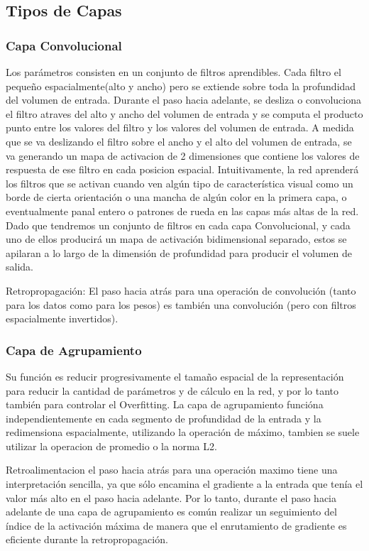 \documentclass[a4paper,11pt,spanish]{book}
\begin{document}
    \subsection {Tipos de Capas}
      \subsubsection{Capa Convolucional} 
	Los parámetros consisten en un conjunto de filtros aprendibles. Cada filtro el pequeño espacialmente(alto y ancho) pero se extiende sobre toda la profundidad del volumen de entrada.
	Durante el paso hacia adelante, se desliza o convoluciona el filtro atraves del alto y ancho del volumen de entrada y se computa el producto punto entre los valores del filtro y los valores
	del volumen de entrada. A medida que se va deslizando el filtro sobre el ancho y el alto del volumen de entrada, se va generando un mapa de activacion de 2 dimensiones que contiene los 
	valores de respuesta de ese filtro en cada posicion espacial.
	Intuitivamente, la red aprenderá los filtros que se activan cuando ven algún tipo de característica visual como un borde de cierta orientación o una mancha de algún color en la 
	primera capa, o eventualmente panal entero o patrones de rueda en las capas más altas de la red. Dado que tendremos un conjunto de filtros en cada capa Convolucional, 
	y cada uno de ellos producirá un mapa de activación bidimensional separado, estos se apilaran a lo largo de la dimensión de profundidad para producir el volumen de salida.

	Retropropagación: El paso hacia atrás para una operación de convolución (tanto para los datos como para los pesos) es también una convolución (pero con filtros espacialmente invertidos).

      \subsubsection{Capa de Agrupamiento} 
	Su función es reducir progresivamente el tamaño espacial de la representación para reducir la cantidad de parámetros y de cálculo en la red, y por lo tanto también para controlar
	el Overfitting. La capa de agrupamiento funcióna independientemente en cada segmento de profundidad de la entrada y la redimensiona espacialmente, utilizando la operación de máximo, 
	tambien se suele utilizar la operacion de promedio o la norma L2.

	Retroalimentacion
	el paso hacia atrás para una operación maximo tiene una interpretación sencilla, ya que sólo encamina el gradiente a la entrada que tenía el valor más alto en el paso hacia
	adelante. Por lo tanto, durante el paso hacia adelante de una capa de agrupamiento es común realizar un seguimiento del índice de la activación máxima de manera que 
	el enrutamiento de gradiente es eficiente durante la retropropagación.
\end{document}
